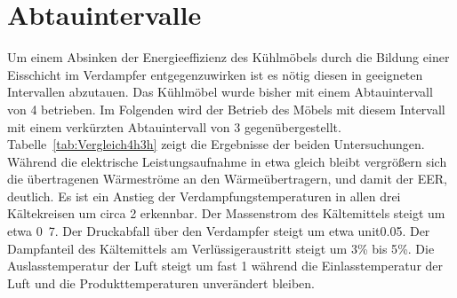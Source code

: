 \section{Abtauintervalle}
\label{sec:Abtauintervalle}

Um einem Absinken der Energieeffizienz des Kühlmöbels durch die Bildung einer Eisschicht im Verdampfer entgegenzuwirken ist es nötig diesen in geeigneten Intervallen abzutauen.
Das Kühlmöbel wurde bisher mit einem Abtauintervall von \unit{4}{\hour} betrieben.
Im Folgenden wird der Betrieb des Möbels mit diesem Intervall mit einem verkürzten Abtauintervall von \unit{3}{\hour} gegenübergestellt. Tabelle~\ref{tab:Vergleich4h3h} zeigt die Ergebnisse der beiden Untersuchungen.
Während die elektrische Leistungsaufnahme in etwa gleich bleibt vergrößern sich die übertragenen Wärmeströme an den Wärmeübertragern, und damit der EER, deutlich.
Es ist ein Anstieg der Verdampfungstemperaturen in allen drei Kältekreisen um circa \unit{2}{\kelvin} erkennbar. Der Massenstrom des Kältemittels steigt um etwa
\unit{0.7}{\gram\per\second}. Der Druckabfall über den Verdampfer steigt um etwa unit{0.05}{\bbar}. Der Dampfanteil des Kältemittels am Verlüssigeraustritt steigt um \unit{3}{\%} bis \unit{5}{\%}. Die Auslasstemperatur der Luft steigt um fast \unit{1}{\kelvin} während die Einlasstemperatur der Luft und die Produkttemperaturen unverändert bleiben.





